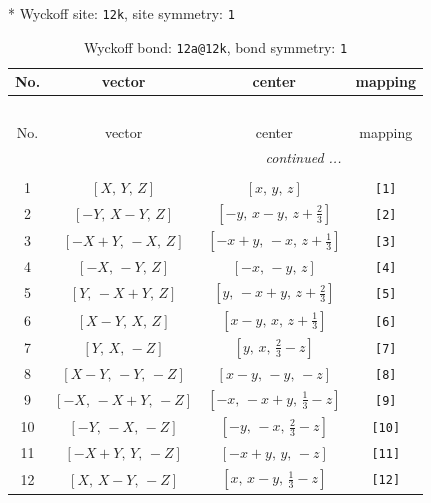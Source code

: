 \documentclass[fleqn,8pt]{jsarticle}
\begin{document}
* Wyckoff site: {\tt 12k}, site symmetry: {\tt 1}
\renewcommand{\arraystretch}{1.2}
\begin{longtable}{cccc}
\caption{Wyckoff bond: {\tt 12a@12k}, bond symmetry: {\tt 1}}
 \\
 \hline \hline
No. & vector & center & mapping \\ \hline \endfirsthead

\multicolumn{3}{l}{\tablename\ \thetable{}} \\
 \hline \hline
No. & vector & center & mapping \\ \hline \endhead

 \hline \hline
\multicolumn{3}{r}{\footnotesize\it continued ...} \\ \endfoot

 \hline \hline
\multicolumn{3}{r}{} \\ \endlastfoot

1 & $\left[ X,\, Y,\, Z \right]$ & $\left[ x,\, y,\, z \right]$ & {\tt [1]} \\ \hline
2 & $\left[ - Y,\, X - Y,\, Z \right]$ & $\left[ - y,\, x - y,\, z + \frac{2}{3} \right]$ & {\tt [2]} \\ \hline
3 & $\left[ - X + Y,\, - X,\, Z \right]$ & $\left[ - x + y,\, - x,\, z + \frac{1}{3} \right]$ & {\tt [3]} \\ \hline
4 & $\left[ - X,\, - Y,\, Z \right]$ & $\left[ - x,\, - y,\, z \right]$ & {\tt [4]} \\ \hline
5 & $\left[ Y,\, - X + Y,\, Z \right]$ & $\left[ y,\, - x + y,\, z + \frac{2}{3} \right]$ & {\tt [5]} \\ \hline
6 & $\left[ X - Y,\, X,\, Z \right]$ & $\left[ x - y,\, x,\, z + \frac{1}{3} \right]$ & {\tt [6]} \\ \hline
7 & $\left[ Y,\, X,\, - Z \right]$ & $\left[ y,\, x,\, \frac{2}{3} - z \right]$ & {\tt [7]} \\ \hline
8 & $\left[ X - Y,\, - Y,\, - Z \right]$ & $\left[ x - y,\, - y,\, - z \right]$ & {\tt [8]} \\ \hline
9 & $\left[ - X,\, - X + Y,\, - Z \right]$ & $\left[ - x,\, - x + y,\, \frac{1}{3} - z \right]$ & {\tt [9]} \\ \hline
10 & $\left[ - Y,\, - X,\, - Z \right]$ & $\left[ - y,\, - x,\, \frac{2}{3} - z \right]$ & {\tt [10]} \\ \hline
11 & $\left[ - X + Y,\, Y,\, - Z \right]$ & $\left[ - x + y,\, y,\, - z \right]$ & {\tt [11]} \\ \hline
12 & $\left[ X,\, X - Y,\, - Z \right]$ & $\left[ x,\, x - y,\, \frac{1}{3} - z \right]$ & {\tt [12]} \\
\end{longtable}
\end{document}
